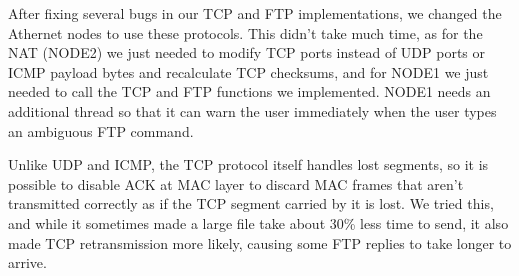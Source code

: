 \documentclass{scrartcl}
\begin{document}
After fixing several bugs in our TCP and FTP implementations, we changed the Athernet nodes to use these protocols. This didn't take much time, as for the NAT (NODE2) we just needed to modify TCP ports instead of UDP ports or ICMP payload bytes and recalculate TCP checksums, and for NODE1 we just needed to call the TCP and FTP functions we implemented. NODE1 needs an additional thread so that it can warn the user immediately when the user types an ambiguous FTP command.

Unlike UDP and ICMP, the TCP protocol itself handles lost segments, so it is possible to disable ACK at MAC layer to discard MAC frames that aren't transmitted correctly as if the TCP segment carried by it is lost. We tried this, and while it sometimes made a large file take about 30\% less time to send, it also made TCP retransmission more likely, causing some FTP replies to take longer to arrive.
\end{document}

